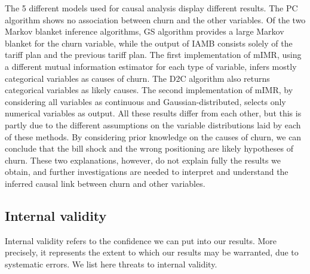 The 5 different models used for causal analysis display different results. The
PC algorithm shows no association between churn and the other variables. Of the
two Markov blanket inference algorithms, GS algorithm provides a large Markov
blanket for the churn variable, while the output of IAMB consists solely of the
tariff plan and the previous tariff plan. The first implementation of mIMR,
using a different mutual information estimator for each type of variable, infers
mostly categorical variables as causes of churn. The D2C algorithm also returns
categorical variables as likely causes. The second implementation of mIMR, by
considering all variables as continuous and Gaussian-distributed, selects only
numerical variables as output. All these results differ from each other, but
this is partly due to the different assumptions on the variable distributions
laid by each of these methods. By considering prior knowledge on the causes of
churn, we can conclude that the bill shock and the wrong positioning are likely
hypotheses of churn. These two explanations, however, do not explain fully the
results we obtain, and further investigations are needed to interpret and
understand the inferred causal link between churn and other variables.

\subsection{Internal validity}

Internal validity refers to the confidence we can put into our results. More
precisely, it represents the extent to which our results may be warranted, due
to systematic errors. We list here threats to internal validity.


